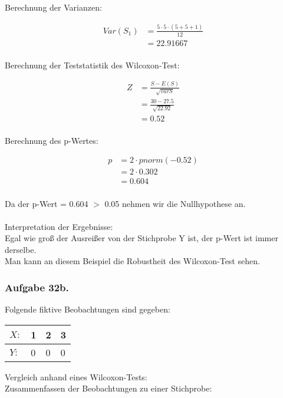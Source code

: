 \documentclass[a4paper,12pt]{article}
\newcommand{\ex}[1]{\newpage\subsubsection*{Aufgabe #1.}}
\begin{document}
Berechnung der Varianzen:

\begin{align*}
Var(S_1)
&= \frac{5\cdot 5 \cdot (5+5+1)}{12} \\
&=  22.91667 \\
\end{align*}


Berechnung der Teststatistik des Wilcoxon-Test:

\begin{align*}
Z
&= \frac{S-E(S)}{\sqrt{varS}} \\
&= \frac{30-27.5}{\sqrt{22.92}}  \\
&=  0.52 \\
\end{align*}

Berechnung des p-Wertes:

\begin{align*}
p
&= 2 \cdot pnorm(-0.52) \\
&= 2 \cdot 0.302  \\
&= 0.604 \\
\end{align*}

Da der p-Wert = 0.604 $>$ 0.05 nehmen wir die Nullhypothese an.\\\\

Interpretation der Ergebnisse:\\

Egal wie groß der Ausreißer von der Stichprobe Y ist, der p-Wert ist immer derselbe.\\
Man kann an diesem Beispiel die Robustheit des Wilcoxon-Test sehen.



\ex{32b}


Folgende fiktive Beobachtungen sind gegeben:\\

\begin{tabular}{ | l | l | l | p{0.5cm} |}
	\hline
	$X:$ & 1 & 2 & 3  \\ \hline
	$Y:$ & 0 & 0 & 0  \\ \hline
\end{tabular}

Vergleich anhand eines Wilcoxon-Tests:\\

Zusammenfassen der Beobachtungen zu einer Stichprobe: \\
\end{document}
